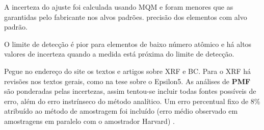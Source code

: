 A incerteza do ajuste foi calculada usando MQM e foram menores que as garantidas
pelo fabricante nos alvos padrões.  precisão dos elementos com alvo padrão. 

O limite de detecção é pior para elementos de baixo número atômico e há
altos valores de incerteza quando a medida está próxima do limite de detecção.

Pegue no endereço do site os textos e artigos sobre XRF e BC.
Para o XRF há revisões nos textos gerais, como na tese sobre o Epsilon5.
As análises de \textbf{PMF} são ponderadas pelas incertezas, assim 
tentou-se incluir todas fontes possíveis de erro, além do erro instrínseco 
do método analítico. Um erro percentual fixo de 8\% atribuído ao método 
de amostragem foi incluído 
(erro médio observado em amostragens em paralelo com o amostrador Harvard)
\citep{santos2014}.





